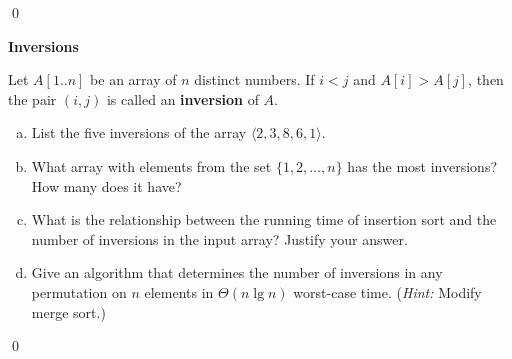 \sol \qed

 \textbf{Inversions}

Let $A[1..n]$ be an array of $n$ distinct numbers. If $i < j$ and $A[i] > A[j]$, then the pair $(i,j)$ is called an \textbf{inversion} of $A$.

\begin{enumerate}[(a)]
    \item List the five inversions of the array $\langle 2, 3, 8, 6, 1 \rangle$.
    \item What array with elements from the set $\{1, 2, \dots, n\}$ has the most inversions? How many does it have?
    \item What is the relationship between the running time of insertion sort and the number of inversions in the input array? Justify your answer.
    \item Give an algorithm that determines the number of inversions in any permutation on $n$ elements in $\Theta(n \lg n)$ worst-case time. (\textit{Hint:} Modify merge sort.)
\end{enumerate}

\sol \qed